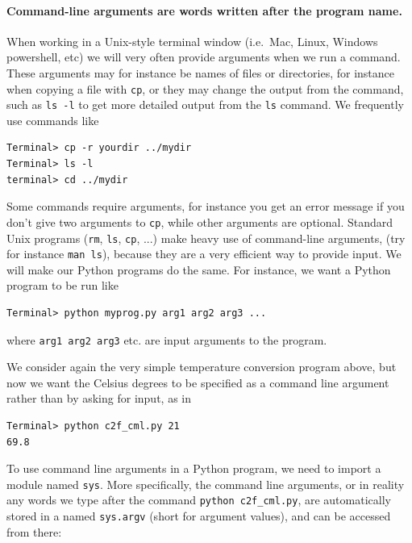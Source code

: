 \documentclass[graybox,envcountchap,sectrefs,final]{svmonodo}
\begin{document}
\paragraph{Command-line arguments are words written after the program name.}
When working in a Unix-style terminal window (i.e.~Mac, Linux, Windows powershell, etc) we will very often provide arguments when we run
a command. These arguments may for instance be names of files or directories, for instance when copying a file with \texttt{cp}, or they may
change the output from the command, such as \texttt{ls -l} to get more detailed output from the \texttt{ls} command. We frequently use commands like
\begin{Verbatim}[frame=lines,label=\fbox{{\tiny Terminal}},framesep=2.5mm,framerule=0.7pt]
Terminal> cp -r yourdir ../mydir
Terminal> ls -l
terminal> cd ../mydir
\end{Verbatim}
Some commands require arguments, for instance you get an error message if you don't give two arguments to \texttt{cp},
while other arguments are optional. Standard Unix programs (\texttt{rm}, \texttt{ls}, \texttt{cp}, ...) make heavy use of
command-line arguments, (try for instance \texttt{man ls}), because they are a very efficient way to provide input.
We will make our Python programs do the same. For instance, we want a Python program to be run like
\begin{Verbatim}[frame=lines,label=\fbox{{\tiny Terminal}},framesep=2.5mm,framerule=0.7pt]
Terminal> python myprog.py arg1 arg2 arg3 ...
\end{Verbatim}
where \texttt{arg1 arg2 arg3} etc. are input arguments to the program.

We consider again the very simple temperature conversion program above, but now we want the Celsius degrees to be specified as a
command line argument rather than by asking for input, as in
\begin{Verbatim}[frame=lines,label=\fbox{{\tiny Terminal}},framesep=2.5mm,framerule=0.7pt]
Terminal> python c2f_cml.py 21
69.8
\end{Verbatim}
To use command line arguments in a Python program, we need to import a module named \texttt{sys}. More specifically, the command line arguments,
or in reality any words we type after the command \Verb!python c2f_cml.py!, are automatically stored in a
named \texttt{sys.argv} (short for argument values), and can be accessed from there:
\end{document}
